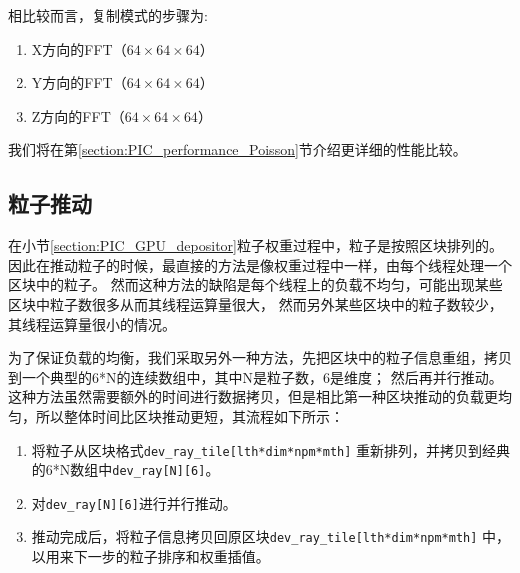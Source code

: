 相比较而言，复制模式的步骤为:
\begin{enumerate}
  \item X方向的FFT（$64 \times 64 \times 64$）
  \item Y方向的FFT（$64 \times 64 \times 64$）
  \item Z方向的FFT（$64 \times 64 \times 64$）
\end{enumerate}

我们将在第\ref{section:PIC_performance_Poisson}节介绍更详细的性能比较。

\subsection{粒子推动}
在小节\ref{section:PIC_GPU_depositor}粒子权重过程中，粒子是按照区块排列的。
因此在推动粒子的时候，最直接的方法是像权重过程中一样，由每个线程处理一个区块中的粒子。
然而这种方法的缺陷是每个线程上的负载不均匀，可能出现某些区块中粒子数很多从而其线程运算量很大，
然而另外某些区块中的粒子数较少，其线程运算量很小的情况。

为了保证负载的均衡，我们采取另外一种方法，先把区块中的粒子信息重组，拷贝到一个典型的6*N的连续数组中，其中N是粒子数，6是维度；
然后再并行推动。这种方法虽然需要额外的时间进行数据拷贝，但是相比第一种区块推动的负载更均匀，所以整体时间比区块推动更短，其流程如下所示：
\begin{enumerate}
  \item 将粒子从区块格式\verb"dev_ray_tile[lth*dim*npm*mth]" 重新排列，并拷贝到经典的6*N数组中\verb"dev_ray[N][6]"。
  \item 对\verb"dev_ray[N][6]"进行并行推动。
  \item 推动完成后，将粒子信息拷贝回原区块\verb"dev_ray_tile[lth*dim*npm*mth]" 中，以用来下一步的粒子排序和权重插值。
\end{enumerate}


